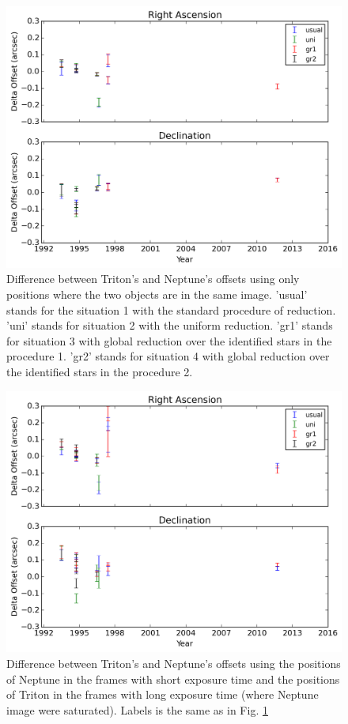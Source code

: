 \documentclass[12pt,a4paper]{report}
\begin{document}
\begin{figure}
\includegraphics[width=16.0cm]{Triton-Netuno_nsat_match.png} 
\caption{Difference between Triton's and Neptune's offsets using only positions where the two objects are in the same image. 'usual' stands for the situation 1 with the standard procedure of reduction. 'uni' stands for situation 2 with the uniform reduction. 'gr1' stands for situation 3 with global reduction over the identified stars in the procedure 1. 'gr2' stands for situation 4 with global reduction over the identified stars in the procedure 2.}
\label{Fig:test-match}
\end{figure}

\begin{figure}
\includegraphics[width=16.0cm]{Triton-Netuno_sat.png} 
\caption{Difference between Triton's and Neptune's offsets using the positions of Neptune in the frames with short exposure time and the positions of Triton in the frames with long exposure time (where Neptune image were saturated). Labels is the same as in Fig. \ref{Fig:test-match}}
\label{Fig:test-sat}
\end{figure}
\end{document}

